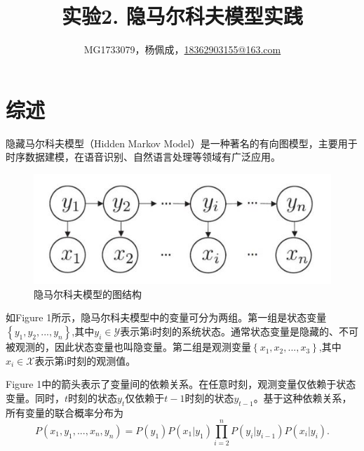 \documentclass[a4paper,UTF8]{article}
\theoremstyle{definition}
\begin{document}
\title{实验2. 隐马尔科夫模型实践}
\author{MG1733079，杨佩成，\url{18362903155@163.com}}
\maketitle

\section*{综述}
	隐藏马尔科夫模型（Hidden Markov Model）是一种著名的有向图模型，主要用于时序数据建模，在语音识别、自然语言处理等领域有广泛应用\cite{reference1}。
\begin{figure}[h]
\centering
\small
\includegraphics{1.JPG}
\caption{隐马尔科夫模型的图结构}
\end{figure}

	如Figure 1所示，隐马尔科夫模型中的变量可分为两组。第一组是状态变量 $\left\{ y_1,y_2,...,y_n\right\}$,其中$y_i \in \mathcal{Y}$表示第i时刻的系统状态。通常状态变量是隐藏的、不可被观测的，因此状态变量也叫隐变量。第二组是观测变量$\left\{ x_1,x_2,...,x_3 \right\}$,其中$x_i \in \mathcal{X}$表示第i时刻的观测值。
	
	Figure 1中的箭头表示了变量间的依赖关系。在任意时刻，观测变量仅依赖于状态变量。同时，$t$时刻的状态$y_t$仅依赖于$t-1$时刻的状态$y_{t-1}$。基于这种依赖关系，所有变量的联合概率分布为
\begin{displaymath}
	P(x_1,y_1,...,x_n,y_n)=P(y_1)P(x_1|y_1)\prod_{i=2}^nP(y_i|y_{i-1})P(x_i|y_i).
\end{displaymath}
\end{document}
